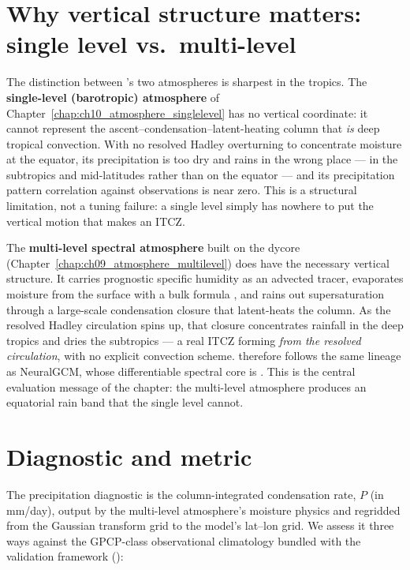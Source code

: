 \section{Why vertical structure matters: single level vs.\ multi-level}

The distinction between \model{}'s two atmospheres is sharpest in the tropics. The
\textbf{single-level (barotropic) atmosphere} of Chapter~\ref{chap:ch10_atmosphere_singlelevel}
has no vertical coordinate: it cannot represent the ascent--condensation--latent-heating column
that \emph{is} deep tropical convection. With no resolved Hadley overturning to concentrate
moisture at the equator, its precipitation is too dry and rains in the wrong place --- in the
subtropics and mid-latitudes rather than on the equator --- and its precipitation pattern
correlation against observations is near zero. This is a structural limitation, not a tuning
failure: a single level simply has nowhere to put the vertical motion that makes an ITCZ.

The \textbf{multi-level spectral atmosphere} built on the \dino{} dycore
(Chapter~\ref{chap:ch09_atmosphere_multilevel}) does have the necessary vertical structure. It
carries prognostic specific humidity as an advected tracer, evaporates moisture from the surface
with a bulk formula \citep{largeyeager2004}, and rains out supersaturation through a large-scale condensation closure
that latent-heats the column. As the resolved Hadley circulation spins up, that closure
concentrates rainfall in the deep tropics and dries the subtropics --- a real ITCZ forming
\emph{from the resolved circulation}, with no explicit convection scheme. \model{} therefore
follows the same lineage as NeuralGCM, whose differentiable spectral core \dino{} is
\citep{kochkov2024neuralgcm}. This is the central evaluation message of the chapter: the
multi-level atmosphere produces an equatorial rain band that the single level cannot.

\section{Diagnostic and metric}

The precipitation diagnostic is the column-integrated condensation rate, $P$ (in mm/day),
output by the multi-level atmosphere's moisture physics and regridded from the Gaussian
transform grid to the model's lat--lon grid. We assess it three ways against the GPCP-class
observational climatology bundled with the validation framework
():

